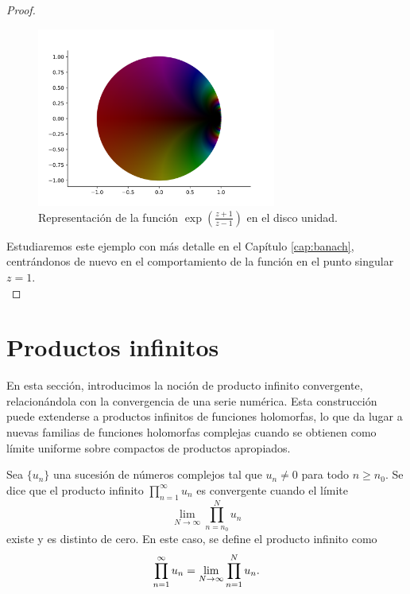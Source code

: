 \begin{proof}
    \begin{figure}[!htbp]
        \centering
        \includegraphics[width=0.7\textwidth]{../Aplicacion/e^((z+1):(z-1)).png}
        \caption{Representación de la función $\exp{\left(\frac{z + 1}{z - 1}\right)}$ en el disco unidad.}
        \label{fig:ejemplo5}
    \end{figure}

     Estudiaremos este ejemplo con más detalle en el Capítulo \ref{cap:banach}, centrándonos de nuevo en el comportamiento de la función en el punto singular $z = 1$. \\
\end{proof}

\section{Productos infinitos}

En esta sección, introducimos la noción de producto infinito convergente, relacionándola con la convergencia de una serie numérica. Esta construcción puede extenderse a productos infinitos de funciones holomorfas, lo que da lugar a nuevas familias de funciones holomorfas complejas cuando se obtienen como límite uniforme sobre compactos de productos apropiados. \\

\begin{definition}
    Sea $\{u_n\}$ una sucesión de números complejos tal que $u_n \neq 0$ para todo $n \geq n_0$. Se dice que el producto infinito $\prod_{n=1}^{\infty} u_n$ es convergente cuando el límite
    \begin{equation*}
        \lim_{N \to \infty} \prod_{n=n_0}^{N} u_n
    \end{equation*}
    existe y es distinto de cero. En este caso, se define el producto infinito como
    \begin{equation*}
        \prod_{n=1}^{\infty} u_n = \lim_{N \to \infty} \prod_{n=1}^{N} u_n. \\
    \end{equation*}
\end{definition}

